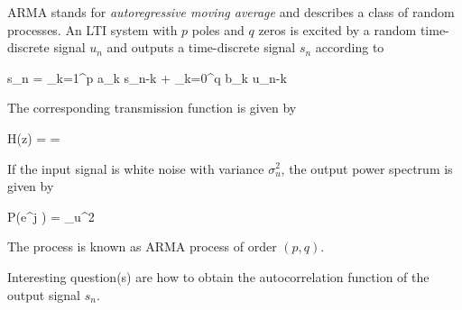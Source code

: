 
ARMA stands for \emph{autoregressive moving average} and describes a class of random processes. An LTI system with $p$ poles and $q$ zeros is excited by a random time-discrete signal $u_n$ and outputs a time-discrete signal $s_n$ according to

\bee
s_n = \sum_{k=1}^p a_k s_{n-k} + \sum_{k=0}^q b_k u_{n-k}
\eee

The corresponding transmission function is given by

\bee
H(z) =  = 
\eee

If the input signal is white noise with variance $\sigma_u^2$, the output power spectrum is given by

\bee
P(e^{j \omega}) = \sigma_u^2 
\eee

The process is known as ARMA process of order $(p,q)$.


Interesting question(s) are how to obtain the autocorrelation function of the output signal $s_n$.


